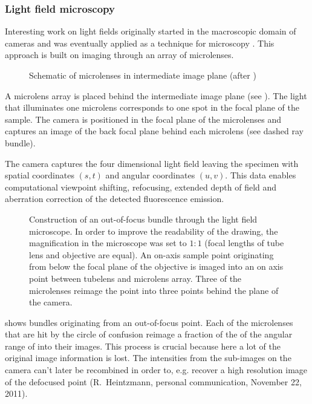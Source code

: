 \subsubsection{Light field microscopy}
Interesting work on light fields originally started in the macroscopic
domain of cameras \citep{Lippmann1908%
} and was eventually
applied as a technique for microscopy
\citep{Levoy2006,Levoy2009,Zhang2009}. This approach is built on imaging through
an array of microlenses.
\begin{figure}[!hbt]
  \centering
  
  \caption{Schematic of microlenses in intermediate image plane (after
    \citep{Levoy2006})}
  \label{fig:microlens-levoy-sketch}
\end{figure}

A microlens array is placed behind the intermediate image plane (see
). The light that illuminates one
microlens corresponds to one spot in the focal plane of the
sample. The camera is positioned in the focal plane of the microlenses
and captures an image of the back focal plane behind each microlens
(see dashed ray bundle).

The camera captures the four dimensional light field leaving the
specimen with spatial coordinates $(s,t)$ and angular coordinates
$(u,v)$. This data enables computational viewpoint shifting,
refocusing, extended depth of field and aberration correction of the
detected fluorescence emission.


\begin{figure}[!hbt]
  \centering
  
  \caption{Construction of an out-of-focus bundle through the light
    field microscope. In order to improve the readability of the
    drawing, the magnification in the microscope was set to $1:1$
    (focal lengths of tube lens and objective are equal). An on-axis
    sample point originating from below the focal plane of the
    objective is imaged into an on axis point between tubelens and
    microlens array. Three of the microlenses reimage the point into
    three points behind the plane of the camera.}
  \label{fig:microlens-levoy-sketch_2}
\end{figure}

 shows bundles originating from
an out-of-focus point. Each of the microlenses that are hit by the
circle of confusion reimage a fraction of the of the angular range of
into their images.  This process is crucial because here a lot of the
original image information is lost. The intensities from the
sub-images on the camera can't later be recombined in order to,
e.g. recover a high resolution image of the defocused point
(R.~Heintzmann, personal communication, November 22, 2011).

